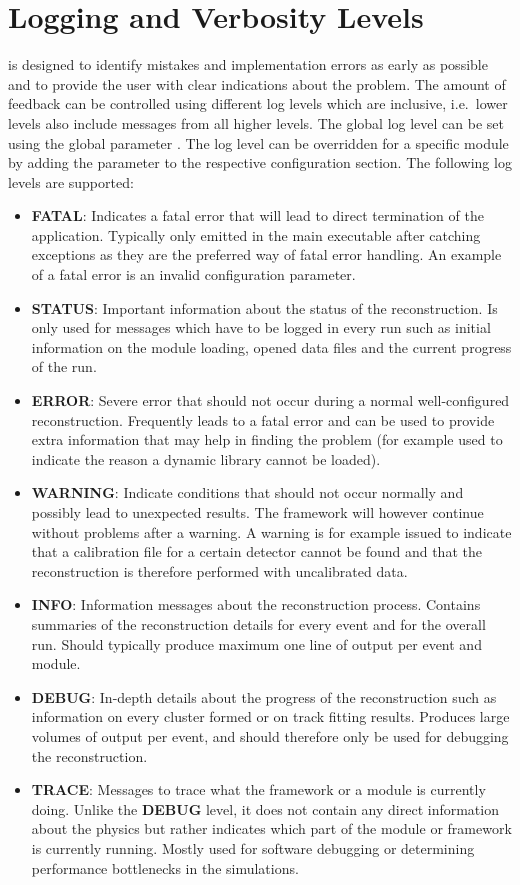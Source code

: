 \section{Logging and Verbosity Levels}
\label{sec:logging_verbosity}
\corry is designed to identify mistakes and implementation errors as early as possible and to provide the user with clear indications about the problem.
The amount of feedback can be controlled using different log levels which are inclusive, i.e.\ lower levels also include messages from all higher levels.
The global log level can be set using the global parameter .
The log level can be overridden for a specific module by adding the  parameter to the respective configuration section.
The following log levels are supported:
\begin{itemize}
\item \textbf{FATAL}: Indicates a fatal error that will lead to direct termination of the application.
Typically only emitted in the main executable after catching exceptions as they are the preferred way of fatal error handling.
An example of a fatal error is an invalid configuration parameter.
\item \textbf{STATUS}: Important information about the status of the reconstruction.
Is only used for messages which have to be logged in every run such as initial information on the module loading, opened data files and the current progress of the run.
\item \textbf{ERROR}: Severe error that should not occur during a normal well-configured reconstruction.
Frequently leads to a fatal error and can be used to provide extra information that may help in finding the problem (for example used to indicate the reason a dynamic library cannot be loaded).
\item \textbf{WARNING}: Indicate conditions that should not occur normally and possibly lead to unexpected results.
The framework will however continue without problems after a warning.
A warning is for example issued to indicate that a calibration file for a certain detector cannot be found and that the reconstruction is therefore performed with uncalibrated data.
\item \textbf{INFO}: Information messages about the reconstruction process.
Contains summaries of the reconstruction details for every event and for the overall run.
Should typically produce maximum one line of output per event and module.
\item \textbf{DEBUG}: In-depth details about the progress of the reconstruction such as information on every cluster formed or on track fitting results.
Produces large volumes of output per event, and should therefore only be used for debugging the reconstruction.
\item \textbf{TRACE}: Messages to trace what the framework or a module is currently doing.
Unlike the \textbf{DEBUG} level, it does not contain any direct information about the physics but rather indicates which part of the module or framework is currently running.
Mostly used for software debugging or determining performance bottlenecks in the simulations.
\end{itemize}

